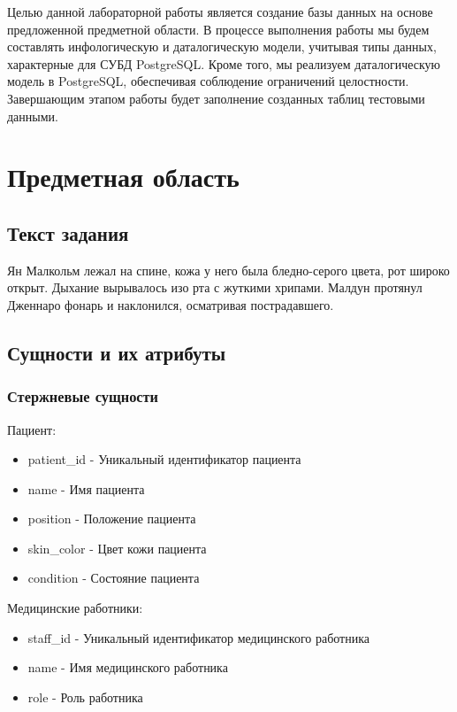 \documentclass[14pt]{extreport}
\begin{document}
    \pagestyle{empty}
    
    \pagestyle{plain}
    \tableofcontents

    \intro Целью данной лабораторной работы является создание базы данных на основе предложенной предметной области. В процессе выполнения работы мы будем составлять инфологическую и даталогическую модели, учитывая типы данных, характерные для СУБД PostgreSQL. Кроме того, мы реализуем даталогическую модель в PostgreSQL, обеспечивая соблюдение ограничений целостности. Завершающим этапом работы будет заполнение созданных таблиц тестовыми данными.

    \chapter{Предметная область}
    \section{Текст задания}
            Ян Малкольм лежал на спине, кожа у него была бледно-серого цвета, рот широко открыт. Дыхание вырывалось изо рта с жуткими хрипами. Малдун протянул Дженнаро фонарь и наклонился, осматривая пострадавшего.

    \section{Сущности и их атрибуты}
        \subsection{Стержневые сущности}
            Пациент:
            \begin{itemize}
                \item patient\_id - Уникальный идентификатор пациента
                \item name - Имя пациента
                \item position - Положение пациента
                \item skin\_color - Цвет кожи пациента
                \item condition - Состояние пациента
            \end{itemize}
                \bigskip


            Медицинские работники:
            \begin{itemize}
                \item staff\_id - Уникальный идентификатор медицинского работника
                \item name - Имя медицинского работника
                \item role - Роль работника
            \end{itemize}
\end{document}
